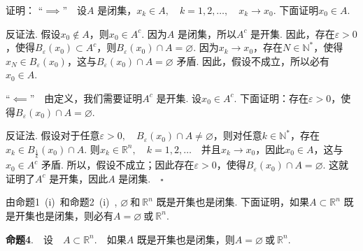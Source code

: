 \documentclass{article}
\begin{document}
\noindent 证明：\newline
“\( \implies \)”\ \ 设\(A\) 是闭集，\(x_k \in A,\quad k = 1,2,\dots ,\quad x_k \to x_0\). 下面证明\(x_0 \in A\).

\vspace{10pt}

\noindent 反证法. 假设\(x_0 \notin A\)，则\(x_0 \in A^{c}\). 因为\(A\) 是闭集，所以\(A^{c}\) 是开集. 因此，存在\(\varepsilon > 0\)，使得\(B_{\varepsilon }(x_0)\subset A^{c}\)，则\(B_{\varepsilon }(x_0)\cap A = \varnothing \). 因为\(x_k \to x_0\)，存在\(N \in \mathbb{N}^{*}\)，使得\(x_N \in B_{\varepsilon }(x_0)\)，这与\(B_{\varepsilon }(x_0)\cap A = \varnothing \) 矛盾. 因此，假设不成立，所以必有\(x_0 \in A\).

\vspace{20pt}

\noindent “\( \impliedby \)”\ \ 由定义，我们需要证明\(A^{c}\) 是开集. 设\(x_0 \in A^{c}\). 下面证明：\newline 存在\(\varepsilon > 0\)，使得\(B_{\varepsilon }(x_0)\cap A = \varnothing\).

\vspace{10pt}

\noindent 反证法. 假设对于任意\(\varepsilon > 0,\quad B_{\varepsilon }(x_0)\cap A \neq  \varnothing\)，则对任意\(k \in \mathbb{N}^{*}\)，存在\(x_k \in B_{\frac{1}{k} }(x_0)\cap A\). 则\(x_k \in \mathbb{R}^n,\quad k = 1,2,\dots \)\ \ 并且\(x_k \to x_0\)，因此\(x_0 \in A\)，这与\(x_0 \in A^{c}\) 矛盾. 所以，假设不成立；因此存在\(\varepsilon > 0\)，使得\(B_{\varepsilon }(x_0)\cap A = \varnothing\). 这就证明了\(A^{c}\) 是开集，因此\(A\) 是闭集.\(\quad \square\)

\newpage

\noindent 由命题1\ (i)\ 和命题2\ (i)\ , \(\varnothing\ \text{和}\ \mathbb{R}^n\) 既是开集也是闭集. 下面证明，如果\(A \subset \mathbb{R}^n\) 既是开集也是闭集，则必有\(A = \varnothing\ \text{或}\ \mathbb{R}^n\).

\vspace{20pt}

\noindent \textbf{命题4}.\ \ 设\ \ \(A \subset \mathbb{R}^n\).\ \ 如果\(A\) 既是开集也是闭集，则\(A = \varnothing\ \text{或}\ \mathbb{R}^n\).

\vspace{20pt}
\end{document}
